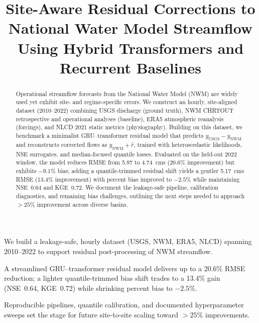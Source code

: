 \documentclass[draft]{agujournal2019}
\begin{document}
\title{Site-Aware Residual Corrections to National Water Model Streamflow Using Hybrid Transformers and Recurrent Baselines}




\begin{keypoints}
\item We build a leakage-safe, hourly dataset (USGS, NWM, ERA5, NLCD) spanning 2010--2022 to support residual post-processing of NWM streamflow.
\item A streamlined GRU--transformer residual model delivers up to a 20.6\% RMSE reduction; a lighter quantile-trimmed bias shift trades to a 13.4\% gain (NSE~0.64, KGE~0.72) while shrinking percent bias to \(-2.5\%\).
\item Reproducible pipelines, quantile calibration, and documented hyperparameter sweeps set the stage for future site-to-site scaling toward \(>25\%\) improvements.
\end{keypoints}

\begin{abstract}
Operational streamflow forecasts from the National Water Model (NWM) are widely used yet exhibit site- and regime-specific errors. We construct an hourly, site-aligned dataset (2010--2022) combining USGS discharge (ground truth), NWM CHRTOUT retrospective and operational analyses (baseline), ERA5 atmospheric reanalysis (forcings), and NLCD 2021 static metrics (physiography). Building on this dataset, we benchmark a minimalist GRU--transformer residual model that predicts \(y_{\text{USGS}} - y_{\text{NWM}}\) and reconstructs corrected flows as \(y_{\text{NWM}} + \hat{r}\), trained with heteroscedastic likelihoods, NSE surrogates, and median-focused quantile losses. Evaluated on the held-out 2022 window, the model reduces RMSE from 5.97 to 4.74~cms (20.6\% improvement) but exhibits \(-9.1\%\) bias; adding a quantile-trimmed residual shift yields a gentler 5.17~cms RMSE (13.4\% improvement) with percent bias improved to \(-2.5\%\) while maintaining NSE~0.64 and KGE~0.72. We document the leakage-safe pipeline, calibration diagnostics, and remaining bias challenges, outlining the next steps needed to approach \(>25\%\) improvement across diverse basins.
\end{abstract}
\end{document}
